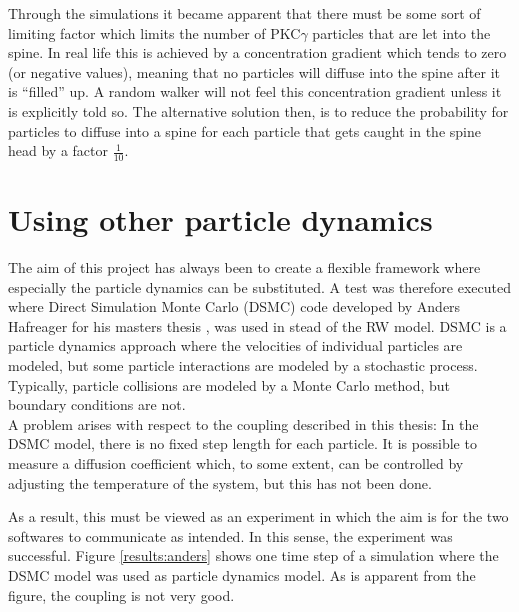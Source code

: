 Through the simulations it became apparent that there must be some sort of limiting factor which limits the number of PKC$\gamma$ particles that are let into the spine. 
In real life this is achieved by a concentration gradient which tends to zero (or negative values), meaning that no particles will diffuse into the spine after it is ``filled'' up. 
A random walker will not feel this concentration gradient unless it is explicitly told so. 
The alternative solution then, is to reduce the probability for particles to diffuse into a spine for each particle that gets caught in the spine head by a factor $\frac{1}{10}$. 

\section{Using other particle dynamics}

The aim of this project has always been to create a flexible framework where especially the particle dynamics can be substituted. 
A test was therefore executed where Direct Simulation Monte Carlo (DSMC) code developed by Anders Hafreager for his masters thesis \cite{hafreager2014flow}, was used in stead of the RW model. 
DSMC is a particle dynamics approach where the velocities of individual particles are modeled, but some particle interactions are modeled by a stochastic process. 
Typically, particle collisions are modeled by a Monte Carlo method, but boundary conditions are not.\\

\noindent A problem arises with respect to the coupling described in this thesis: 
In the DSMC model, there is no fixed step length for each particle. It is possible to measure a diffusion coefficient which, to some extent, can be controlled by adjusting the temperature of the system, but this has not been done. 

As a result, this must be viewed as an experiment in which the aim is for the two softwares to communicate as intended. 
In this sense, the experiment was successful. 
Figure \ref{results:anders} shows one time step of a simulation where the DSMC model was used as particle dynamics model. 
As is apparent from the figure, the coupling is not very good. 

